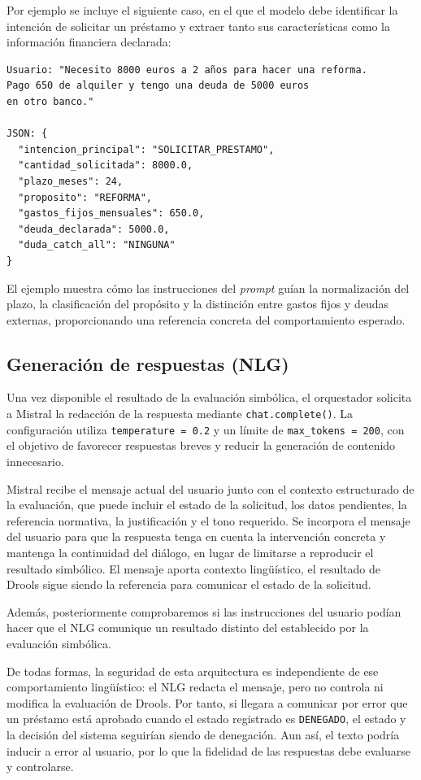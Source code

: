 \documentclass[12pt,a4paper]{report}
\begin{document}
Por ejemplo se incluye el siguiente caso, en el que el modelo debe identificar la intención de solicitar un préstamo y extraer tanto sus características como la información financiera declarada:

\begin{verbatim}
Usuario: "Necesito 8000 euros a 2 años para hacer una reforma. 
Pago 650 de alquiler y tengo una deuda de 5000 euros 
en otro banco."

JSON: {
  "intencion_principal": "SOLICITAR_PRESTAMO",
  "cantidad_solicitada": 8000.0,
  "plazo_meses": 24,
  "proposito": "REFORMA",
  "gastos_fijos_mensuales": 650.0,
  "deuda_declarada": 5000.0,
  "duda_catch_all": "NINGUNA"
}
\end{verbatim}

El ejemplo muestra cómo las instrucciones del \textit{prompt} guían la normalización del plazo, la clasificación del propósito y la distinción entre gastos fijos y deudas externas, proporcionando una referencia concreta del comportamiento esperado.

\subsection{Generación de respuestas (NLG)}

Una vez disponible el resultado de la evaluación simbólica, el orquestador solicita a Mistral la redacción de la respuesta mediante \texttt{chat.complete()}. La configuración utiliza \texttt{temperature = 0.2} y un límite de \texttt{max\_tokens = 200}, con el objetivo de favorecer respuestas breves y reducir la generación de contenido innecesario.

Mistral recibe el mensaje actual del usuario junto con el contexto estructurado de la evaluación, que puede incluir el estado de la solicitud, los datos pendientes, la referencia normativa, la justificación y el tono requerido. Se incorpora el mensaje del usuario para que la respuesta tenga en cuenta la intervención concreta y mantenga la continuidad del diálogo, en lugar de limitarse a reproducir el resultado simbólico. El mensaje aporta contexto lingüístico, el resultado de Drools sigue siendo la referencia para comunicar el estado de la solicitud.

Además, posteriormente comprobaremos si las instrucciones del usuario podían hacer que el NLG comunique un resultado distinto del establecido por la evaluación simbólica.

De todas formas, la seguridad de esta arquitectura es independiente de ese comportamiento lingüístico: el NLG redacta el mensaje, pero no controla ni modifica la evaluación de Drools. Por tanto, si llegara a comunicar por error que un préstamo está aprobado cuando el estado registrado es \texttt{DENEGADO}, el estado y la decisión del sistema seguirían siendo de denegación. Aun así, el texto podría inducir a error al usuario, por lo que la fidelidad de las respuestas debe evaluarse y controlarse.
\end{document}
